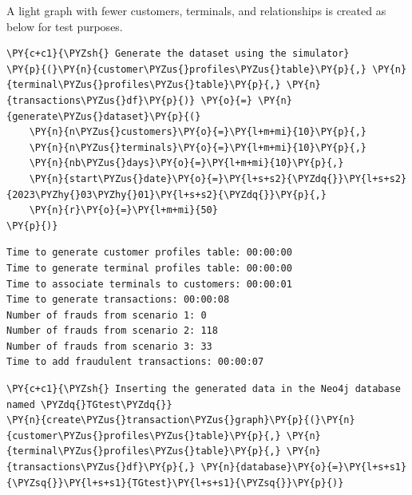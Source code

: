     A light graph with fewer customers, terminals, and relationships is
created as below for test purposes.

    \begin{tcolorbox}[breakable, size=fbox, boxrule=1pt, pad at break*=1mm,colback=cellbackground, colframe=cellborder]
\begin{Verbatim}[commandchars=\\\{\}]
\PY{c+c1}{\PYZsh{} Generate the dataset using the simulator}
\PY{p}{(}\PY{n}{customer\PYZus{}profiles\PYZus{}table}\PY{p}{,} \PY{n}{terminal\PYZus{}profiles\PYZus{}table}\PY{p}{,} \PY{n}{transactions\PYZus{}df}\PY{p}{)} \PY{o}{=} \PY{n}{generate\PYZus{}dataset}\PY{p}{(}
    \PY{n}{n\PYZus{}customers}\PY{o}{=}\PY{l+m+mi}{10}\PY{p}{,}
    \PY{n}{n\PYZus{}terminals}\PY{o}{=}\PY{l+m+mi}{10}\PY{p}{,}
    \PY{n}{nb\PYZus{}days}\PY{o}{=}\PY{l+m+mi}{10}\PY{p}{,}
    \PY{n}{start\PYZus{}date}\PY{o}{=}\PY{l+s+s2}{\PYZdq{}}\PY{l+s+s2}{2023\PYZhy{}03\PYZhy{}01}\PY{l+s+s2}{\PYZdq{}}\PY{p}{,}
    \PY{n}{r}\PY{o}{=}\PY{l+m+mi}{50}
\PY{p}{)}
\end{Verbatim}
\end{tcolorbox}

    \begin{Verbatim}[commandchars=\\\{\}]
Time to generate customer profiles table: 00:00:00
Time to generate terminal profiles table: 00:00:00
Time to associate terminals to customers: 00:00:01
Time to generate transactions: 00:00:08
Number of frauds from scenario 1: 0
Number of frauds from scenario 2: 118
Number of frauds from scenario 3: 33
Time to add fraudulent transactions: 00:00:07
    \end{Verbatim}

    \begin{tcolorbox}[breakable, size=fbox, boxrule=1pt, pad at break*=1mm,colback=cellbackground, colframe=cellborder]
\begin{Verbatim}[commandchars=\\\{\}]
\PY{c+c1}{\PYZsh{} Inserting the generated data in the Neo4j database named \PYZdq{}TGtest\PYZdq{}}
\PY{n}{create\PYZus{}transaction\PYZus{}graph}\PY{p}{(}\PY{n}{customer\PYZus{}profiles\PYZus{}table}\PY{p}{,} \PY{n}{terminal\PYZus{}profiles\PYZus{}table}\PY{p}{,} \PY{n}{transactions\PYZus{}df}\PY{p}{,} \PY{n}{database}\PY{o}{=}\PY{l+s+s1}{\PYZsq{}}\PY{l+s+s1}{TGtest}\PY{l+s+s1}{\PYZsq{}}\PY{p}{)}
\end{Verbatim}
\end{tcolorbox}

